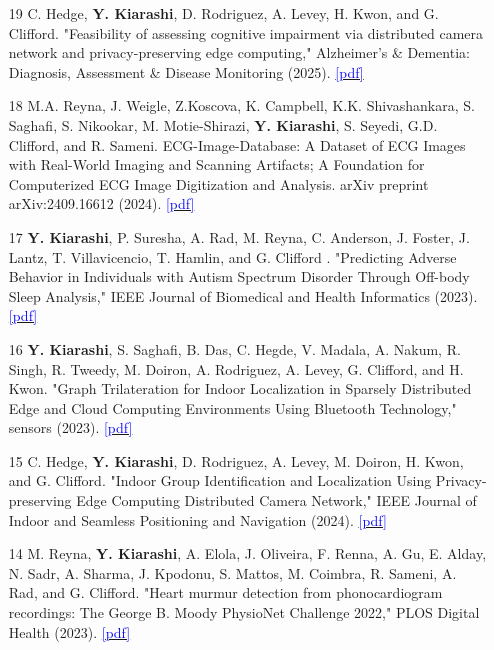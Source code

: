 \documentclass[margin, line]{res}
\newenvironment{list1}{
  \begin{list}{\ding{113}}{%
      \setlength{\itemsep}{0in}
      \setlength{\parsep}{0in} \setlength{\parskip}{0in}
      \setlength{\topsep}{0in} \setlength{\partopsep}{0in} 
      \setlength{\leftmargin}{0.17in}}}{\end{list}}
\begin{document}
\begin{resume}
\begin{list1}
\begin{itemize}
    \item [19]   C. Hedge, \textbf{Y. Kiarashi}, D. Rodriguez, A. Levey, H. Kwon, and G. Clifford. "Feasibility of assessing cognitive impairment via distributed camera network and privacy-preserving edge computing," Alzheimer's \& Dementia: Diagnosis, Assessment \& Disease Monitoring (2025). \href{https://arxiv.org/abs/2408.10442}{\textcolor{blue}{[pdf]}}
    
    \item [18]  M.A. Reyna, J. Weigle, Z.Koscova, K. Campbell, K.K. Shivashankara, S. Saghafi, S. Nikookar, M. Motie-Shirazi, \textbf{Y. Kiarashi}, S. Seyedi, G.D. Clifford, and R. Sameni. ECG-Image-Database: A Dataset of ECG Images with Real-World Imaging and Scanning Artifacts; A Foundation for Computerized ECG Image Digitization and Analysis. arXiv preprint arXiv:2409.16612 (2024). \href{https://arxiv.org/abs/2409.16612}{\textcolor{blue}{[pdf]}}

    \item [17]  \textbf{Y. Kiarashi}, P. Suresha, A. Rad, M. Reyna, C. Anderson, J. Foster, J. Lantz, T. Villavicencio, T.  Hamlin, and G. Clifford . "Predicting Adverse Behavior in Individuals with Autism Spectrum Disorder Through Off-body Sleep Analysis," IEEE Journal of Biomedical and Health Informatics (2023). \href{https://ieeexplore.ieee.org/abstract/document/10669162}{\textcolor{blue}{[pdf]}}

    \item [16]  \textbf{Y. Kiarashi}, S. Saghafi, B. Das, C. Hegde, V. Madala, A. Nakum, R. Singh, R. Tweedy, M. Doiron, A. Rodriguez, A. Levey, G. Clifford, and H. Kwon. "Graph Trilateration for Indoor Localization in Sparsely Distributed Edge and Cloud Computing Environments Using Bluetooth Technology," sensors (2023). \href{https://www.mdpi.com/1424-8220/23/23/9517}{\textcolor{blue}{[pdf]}}

    \item [15]  C. Hedge, \textbf{Y. Kiarashi}, D. Rodriguez, A. Levey, M. Doiron, H. Kwon, and G. Clifford. "Indoor Group Identification and Localization Using Privacy-preserving Edge Computing Distributed Camera Network," IEEE Journal of Indoor and Seamless Positioning and Navigation (2024). \href{https://ieeexplore.ieee.org/abstract/document/10400779}{\textcolor{blue}{[pdf]}}


     \item [14]  M. Reyna, \textbf{Y. Kiarashi}, A. Elola, J. Oliveira, F. Renna, A. Gu, E. Alday, N. Sadr, A. Sharma, J. Kpodonu, S. Mattos, M. Coimbra, R. Sameni, A. Rad, and G. Clifford. "Heart murmur detection from phonocardiogram recordings: The George B. Moody PhysioNet Challenge 2022," PLOS Digital Health (2023). \href{https://journals.plos.org/digitalhealth/article?id=10.1371/journal.pdig.0000324}{\textcolor{blue}{[pdf]}}


\end{itemize}
\end{list1}
\end{resume}
\end{document}
